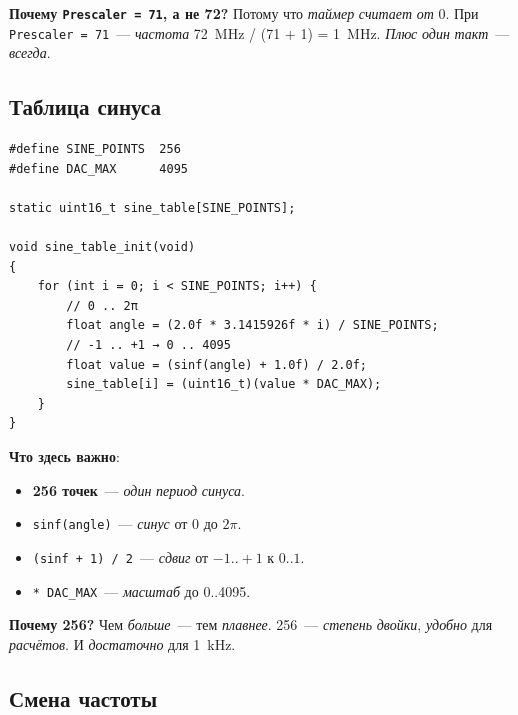 \begin{keybox}
\textbf{Почему \texttt{Prescaler = 71}, а не 72?} Потому
что \emph{таймер} \emph{считает} \emph{от} 0. При
\texttt{Prescaler = 71}~--- \emph{частота} \SI{72}{\mega\hertz}
/ (71 + 1) = \SI{1}{\mega\hertz}. \emph{Плюс} \emph{один}
\emph{такт}~--- \emph{всегда}.
\end{keybox}

\subsection{Таблица синуса}

\begin{listing}[htbp]
\begin{verbatim}
#define SINE_POINTS  256
#define DAC_MAX      4095

static uint16_t sine_table[SINE_POINTS];

void sine_table_init(void)
{
    for (int i = 0; i < SINE_POINTS; i++) {
        // 0 .. 2π
        float angle = (2.0f * 3.1415926f * i) / SINE_POINTS;
        // -1 .. +1 → 0 .. 4095
        float value = (sinf(angle) + 1.0f) / 2.0f;
        sine_table[i] = (uint16_t)(value * DAC_MAX);
    }
}
\end{verbatim}
\caption{\texttt{sine\_table\_init()}~--- заполнение таблицы синуса}
\label{lst:gen-sine-table}
\end{listing}

\textbf{Что здесь важно}:
\begin{itemize}
    \item \textbf{256 точек}~--- \emph{один} \emph{период}
          \emph{синуса}.
    \item \texttt{sinf(angle)}~--- \emph{синус} от \num{0}
          до $2\pi$.
    \item \texttt{(sinf + 1) / 2}~--- \emph{сдвиг} от $-1..+1$
          к $0..1$.
    \item \texttt{* DAC\_MAX}~--- \emph{масштаб} до
          \num{0}..\num{4095}.
\end{itemize}

\begin{ideabox}
\textbf{Почему \num{256}?} Чем \emph{больше}~--- тем
\emph{плавнее}. \num{256}~--- \emph{степень} \emph{двойки},
\emph{удобно} для \emph{расчётов}. И \emph{достаточно}
для \SI{1}{\kilo\hertz}.
\end{ideabox}

\subsection{Смена частоты}

